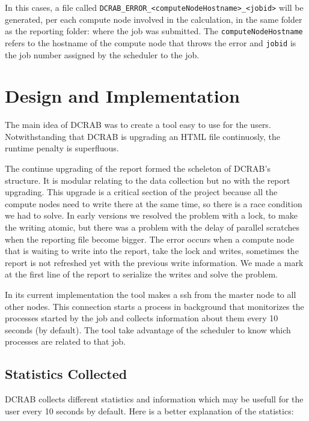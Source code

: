 \documentclass[10pt,a4paper]{report}
\begin{document}
In this cases, a file called \verb+DCRAB_ERROR_<computeNodeHostname>_<jobid>+ will be generated, per each compute node involved in the calculation, in the same folder as the reporting folder: where the job was submitted. The \verb+computeNodeHostname+ refers to the hostname of the compute node that throws the error and \verb+jobid+ is the job number assigned by the scheduler to the job.


\chapter{Design and Implementation}

The main idea of DCRAB was to create a tool easy to use for the users. Notwithstanding that DCRAB is upgrading an HTML file continuosly, the runtime penalty is superfluous.

The continue upgrading of the report formed the scheleton of DCRAB's structure. It is modular relating to the data collection but no with the report upgrading. This upgrade is a critical section of the project because all the compute nodes need to write there at the same time, so there is a race condition we had to solve. In early versions we resolved the problem with a lock, to make the writing atomic, but there was a problem with the delay of parallel scratches when the reporting file become bigger. The error occurs when a compute node that is waiting to write into the report, take the lock and writes, sometimes the report is not refreshed yet with the previous write information. We made a mark at the first line of the report to serialize the writes and solve the problem.

In its current implementation the tool makes a ssh from the master node to all other nodes. This connection starts a process in background that monitorizes the processes started by the job and collects information about them every 10 seconds (by default). The tool take advantage of the scheduler to know which processes are related to that job.

\section{Statistics Collected}

DCRAB collects different statistics and information which may be usefull for the user every 10 seconds by default. Here is a better explanation of the statistics:
\end{document}
